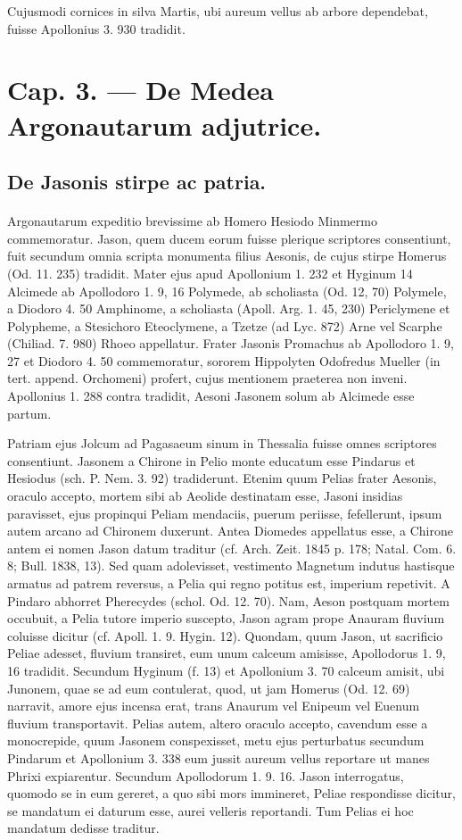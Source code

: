 \documentclass[landscape, a4paper, 11pt, oneside, polutonikogreek, german]{article}
\begin{document}
Cujusmodi cornices in silva Martis, ubi aureum vellus ab arbore dependebat, fuisse Apollonius 3. 930 tradidit.
\clearpage
\section{Cap. 3. --- De Medea Argonautarum adjutrice.}
\subsection{De Jasonis stirpe ac patria.}
\paragraph{}
Argonautarum expeditio brevissime ab Homero Hesiodo Minmermo commemoratur. Jason, quem ducem eorum fuisse plerique scriptores consentiunt, fuit secundum omnia scripta monumenta filius Aesonis, de cujus stirpe Homerus (Od. 11. 235) tradidit. Mater ejus apud Apollonium 1. 232 et Hyginum 14 Alcimede ab Apollodoro 1. 9, 16 Polymede, ab scholiasta (Od. 12, 70) Polymele, a Diodoro 4. 50 Amphinome, a scholiasta (Apoll. Arg. 1. 45, 230) Periclymene et Polypheme, a Stesichoro Eteoclymene, a Tzetze (ad Lyc. 872) Arne vel Scarphe (Chiliad. 7. 980) Rhoeo appellatur. Frater Jasonis Promachus ab Apollodoro 1. 9, 27 et Diodoro 4. 50 commemoratur, sororem Hippolyten Odofredus Mueller (in tert. append. Orchomeni) profert, cujus mentionem praeterea non inveni. Apollonius 1. 288 contra tradidit, Aesoni Jasonem solum ab Alcimede esse partum.

Patriam ejus Jolcum ad Pagasaeum sinum in Thessalia fuisse omnes scriptores consentiunt. Jasonem a Chirone in Pelio monte educatum esse Pindarus et Hesiodus (sch. P. Nem. 3. 92) tradiderunt. Etenim quum Pelias frater Aesonis, oraculo accepto, mortem sibi ab Aeolide destinatam esse, Jasoni insidias paravisset, ejus propinqui Peliam mendaciis, puerum periisse, fefellerunt, ipsum autem arcano ad Chironem duxerunt. Antea Diomedes appellatus esse, a Chirone antem ei nomen Jason datum traditur (cf. Arch. Zeit. 1845 p. 178; Natal. Com. 6. 8; Bull. 1838, 13). Sed quam adolevisset, vestimento Magnetum indutus hastisque armatus ad patrem reversus, a Pelia qui regno potitus est, imperium repetivit. A Pindaro abhorret Pherecydes (schol. Od. 12. 70). Nam, Aeson postquam mortem occubuit, a Pelia tutore imperio suscepto, Jason agram prope Anauram fluvium coluisse dicitur (cf. Apoll. 1. 9. Hygin. 12). Quondam, quum Jason, ut sacrificio Peliae adesset, fluvium transiret, eum unum calceum amisisse, Apollodorus 1. 9, 16 tradidit. Secundum Hyginum (f. 13) et Apollonium 3. 70 calceum amisit, ubi Junonem, quae se ad eum contulerat, quod, ut jam Homerus (Od. 12. 69) narravit, amore ejus incensa erat, trans Anaurum vel Enipeum vel Euenum fluvium transportavit. Pelias autem, altero oraculo accepto, cavendum esse a monocrepide, quum Jasonem conspexisset, metu ejus perturbatus secundum Pindarum et Apollonium 3. 338 eum jussit aureum vellus reportare ut manes Phrixi expiarentur. Secundum Apollodorum 1. 9. 16. Jason interrogatus, quomodo se in eum gereret, a quo sibi mors immineret, Peliae respondisse dicitur, se mandatum ei daturum esse, aurei velleris reportandi. Tum Pelias ei hoc mandatum dedisse traditur.
\end{document}
